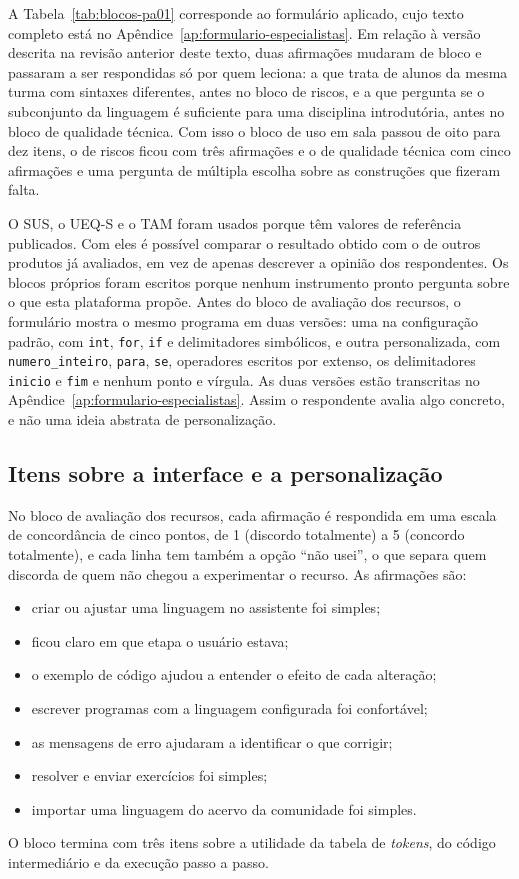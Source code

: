 A Tabela~\ref{tab:blocos-pa01} corresponde ao formulário aplicado, cujo texto completo está no Apêndice~\ref{ap:formulario-especialistas}. Em relação à versão descrita na revisão anterior deste texto, duas afirmações mudaram de bloco e passaram a ser respondidas só por quem leciona: a que trata de alunos da mesma turma com sintaxes diferentes, antes no bloco de riscos, e a que pergunta se o subconjunto da linguagem é suficiente para uma disciplina introdutória, antes no bloco de qualidade técnica. Com isso o bloco de uso em sala passou de oito para dez itens, o de riscos ficou com três afirmações e o de qualidade técnica com cinco afirmações e uma pergunta de múltipla escolha sobre as construções que fizeram falta.

O SUS, o UEQ-S e o TAM foram usados porque têm valores de referência publicados. Com eles é possível comparar o resultado obtido com o de outros produtos já avaliados, em vez de apenas descrever a opinião dos respondentes. Os blocos próprios foram escritos porque nenhum instrumento pronto pergunta sobre o que esta plataforma propõe. Antes do bloco de avaliação dos recursos, o formulário mostra o mesmo programa em duas versões: uma na configuração padrão, com \texttt{int}, \texttt{for}, \texttt{if} e delimitadores simbólicos, e outra personalizada, com \texttt{numero\_inteiro}, \texttt{para}, \texttt{se}, operadores escritos por extenso, os delimitadores \texttt{inicio} e \texttt{fim} e nenhum ponto e vírgula. As duas versões estão transcritas no Apêndice~\ref{ap:formulario-especialistas}. Assim o respondente avalia algo concreto, e não uma ideia abstrata de personalização.

\subsection{Itens sobre a interface e a personalização}

No bloco de avaliação dos recursos, cada afirmação é respondida em uma escala de concordância de cinco pontos, de 1 (discordo totalmente) a 5 (concordo totalmente), e cada linha tem também a opção ``não usei'', o que separa quem discorda de quem não chegou a experimentar o recurso. As afirmações são:

\begin{itemize}
    \item criar ou ajustar uma linguagem no assistente foi simples;
    \item ficou claro em que etapa o usuário estava;
    \item o exemplo de código ajudou a entender o efeito de cada alteração;
    \item escrever programas com a linguagem configurada foi confortável;
    \item as mensagens de erro ajudaram a identificar o que corrigir;
    \item resolver e enviar exercícios foi simples;
    \item importar uma linguagem do acervo da comunidade foi simples.
\end{itemize}
 O bloco termina com três itens sobre a utilidade da tabela de \textit{tokens}, do código intermediário e da execução passo a passo.

